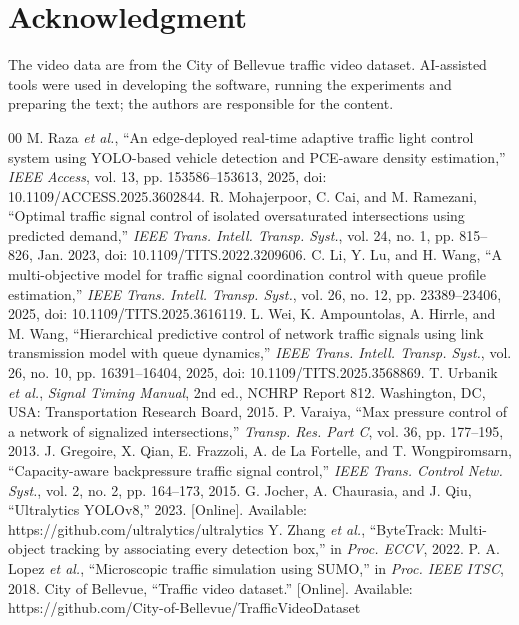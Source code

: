 \documentclass[conference]{IEEEtran}
\begin{document}
\section*{Acknowledgment}
The video data are from the City of Bellevue traffic video dataset. AI-assisted tools were
used in developing the software, running the experiments and preparing the text; the authors are responsible for the content.

\begin{thebibliography}{00}
 M. Raza \emph{et al.}, ``An edge-deployed real-time adaptive traffic
light control system using YOLO-based vehicle detection and PCE-aware density
estimation,'' \emph{IEEE Access}, vol. 13, pp. 153586--153613, 2025, doi: 10.1109/ACCESS.2025.3602844.
 R. Mohajerpoor, C. Cai, and M. Ramezani, ``Optimal traffic
signal control of isolated oversaturated intersections using predicted demand,''
\emph{IEEE Trans. Intell. Transp. Syst.}, vol. 24, no. 1, pp. 815--826, Jan. 2023, doi: 10.1109/TITS.2022.3209606.
 C. Li, Y. Lu, and H. Wang, ``A multi-objective model for traffic signal
coordination control with queue profile estimation,'' \emph{IEEE Trans. Intell. Transp.
Syst.}, vol. 26, no. 12, pp. 23389--23406, 2025, doi: 10.1109/TITS.2025.3616119.
 L. Wei, K. Ampountolas, A. Hirrle, and M. Wang, ``Hierarchical predictive control
of network traffic signals using link transmission model with queue dynamics,''
\emph{IEEE Trans. Intell. Transp. Syst.}, vol. 26, no. 10, pp. 16391--16404, 2025, doi: 10.1109/TITS.2025.3568869.
 T. Urbanik \emph{et al.}, \emph{Signal Timing Manual}, 2nd ed., NCHRP
Report 812. Washington, DC, USA: Transportation Research Board, 2015.
 P. Varaiya, ``Max pressure control of a network of signalized
intersections,'' \emph{Transp. Res. Part C}, vol. 36, pp. 177--195, 2013.
 J. Gregoire, X. Qian, E. Frazzoli, A. de La Fortelle, and T.
Wongpiromsarn, ``Capacity-aware backpressure traffic signal control,'' \emph{IEEE Trans.
Control Netw. Syst.}, vol. 2, no. 2, pp. 164--173, 2015.
 G. Jocher, A. Chaurasia, and J. Qiu, ``Ultralytics YOLOv8,'' 2023.
[Online]. Available: https://github.com/ultralytics/ultralytics
 Y. Zhang \emph{et al.}, ``ByteTrack: Multi-object tracking by
associating every detection box,'' in \emph{Proc. ECCV}, 2022.
 P. A. Lopez \emph{et al.}, ``Microscopic traffic simulation using SUMO,''
in \emph{Proc. IEEE ITSC}, 2018.
 City of Bellevue, ``Traffic video dataset.'' [Online]. Available:
https://github.com/City-of-Bellevue/TrafficVideoDataset
\end{thebibliography}
\end{document}
